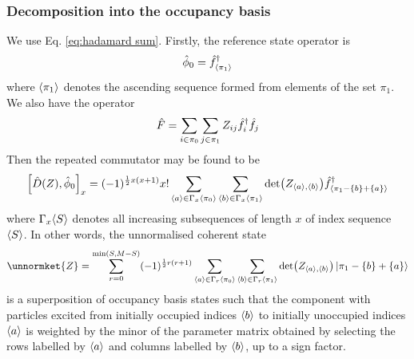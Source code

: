 \subsubsection{Decomposition into the occupancy basis}
We use Eq. \ref{eq:hadamard sum}. Firstly, the reference state operator is
\begin{equation}
\hat{\phi}_0=\hat{f}^\dagger_{\langle \pi_1\rangle}
\end{equation}
where $\langle \pi_1\rangle$ denotes the ascending sequence formed from elements of the set $\pi_1$. We also have the operator
\begin{equation}
\hat{F}=\sum_{i\in\pi_0}\sum_{j\in\pi_1}Z_{ij}\hat{f}^\dagger_i\hat{f}_j
\end{equation}
Then the repeated commutator may be found to be
\begin{equation}
\comm{\hat{D}(Z)}{\hat{\phi}_0}_x=
	(-1)^{\frac{1}{2}x(x+1)}x!\sum_{\seq{a}\in\Gamma_x\seq{\pi_0}}\sum_{\seq{b}\in\Gamma_x\seq{\pi_1}}\det(Z_{\seq{a},\seq{b}})\hat{f}\hc_{\seq{\pi_1-\{b\}+\{a\}}}
\end{equation}
where $\Gamma_x\langle S\rangle$ denotes all increasing subsequences of length $x$ of index sequence $\langle S\rangle$. In other words, the unnormalised coherent state
\begin{equation}
\unnormket{Z}=\sum_{r=0}^{\min(S,M-S)}(-1)^{\frac{1}{2}r(r+1)}\sum_{\seq{a}\in\Gamma_r\seq{\pi_0}}\sum_{\seq{b}\in\Gamma_r\seq{\pi_1}}\det(Z_{\seq{a},\seq{b}})\ket{\pi_1-\{b\}+\{a\}}
\end{equation}
is a superposition of occupancy basis states such that the component with particles excited from initially occupied indices $\langle b\rangle$ to initially unoccupied indices $\langle a\rangle$ is weighted by the minor of the parameter matrix obtained by selecting the rows labelled by $\langle a\rangle$ and columns labelled by $\langle b\rangle$, up to a sign factor.

